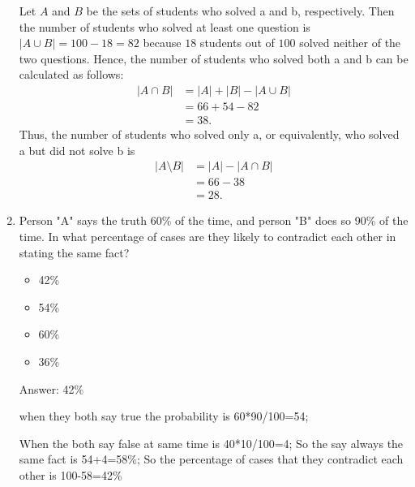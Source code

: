 \documentclass{article}
\begin{document}
\begin{enumerate}
    Let  \(A\) and  \(B\) be the sets of students who solved a and b, respectively. Then the number of students who solved at least one question is  \(\lvert{A \cup B}\rvert=100-18=82\) because  \(18\) students out of  \(100\) solved neither of the two questions. Hence, the number of students who solved both a and b can be calculated as follows:
     \[\begin{aligned} \lvert{A \cap B}\rvert &= \lvert{A}\rvert+\lvert{B}\rvert-\lvert{A \cup B}\rvert \\ &= 66+54-82 \\ &= 38. \end{aligned} \]
    Thus, the number of students who solved only a, or equivalently, who solved a but did not solve b is
     \[\begin{aligned} \lvert{A \setminus B}\rvert &= \lvert{A}\rvert-\lvert{A \cap B}\rvert \\ &= 66-38 \\ &= 28. \end{aligned} \]
     
     \item Person "A" says the truth 60\% of the time, and person "B" does so 90\% of the time. In what percentage of cases are they likely to contradict each other in stating the same fact?
     
     \begin{itemize}
         \item 42\%
         \item 54\%
         \item 60\%
         \item 36\%
     \end{itemize}
     
     Answer: 42\%
     
     when they both say true the probability is 60*90/100=54;

    When the both say false at same time is 40*10/100=4;
    So the say always the same fact is 54+4=58\%;    
    So the percentage of cases that they contradict each other is 100-58=42\%
     
\end{enumerate}
\end{document}
